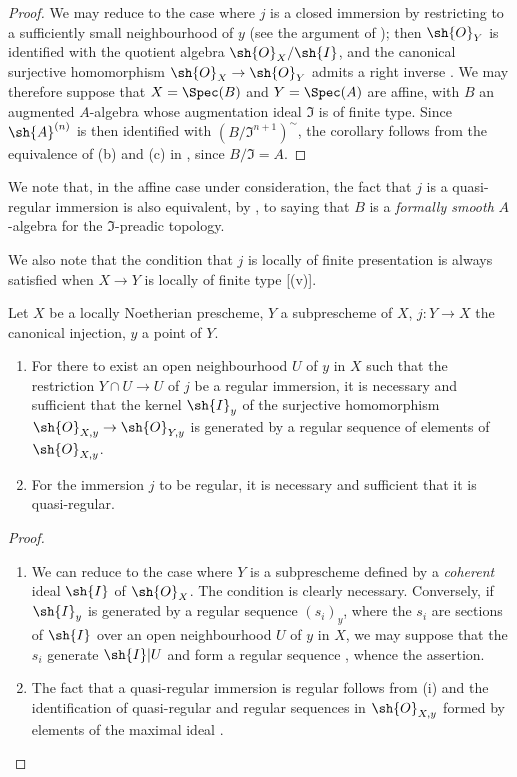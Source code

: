 \begin{proof}
We may reduce to the case where $j$ is a closed immersion by restricting to a sufficiently small neighbourhood of $y$ (see the argument of ); then $\sh{O}_Y$ is identified with the quotient algebra $\sh{O}_X/\sh{I}$, and the canonical surjective homomorphism $\sh{O}_X \to \sh{O}_Y$ admits a
right inverse .
We may therefore suppose that $X = \Spec(B)$ and $Y = \Spec(A)$ are affine, with $B$ an augmented $A$-algebra whose augmentation ideal $\mathfrak{I}$ is of finite type.
Since $\sh{A}^{(n)}$ is then identified with $(B/\mathfrak{I}^{n+1})^{\sim}$, the corollary follows from the equivalence of (b) and (c) in , since $B/\mathfrak{I} = A$.
\end{proof}

We note that, in the affine case under consideration, the fact that $j$ is a quasi-regular immersion is also equivalent, by , to saying that $B$ is a \emph{formally smooth} $A$-algebra for the $\mathfrak{I}$-preadic topology.

We also note that the condition that $j$ is locally of finite presentation is always satisfied when $X \to Y$ is locally of finite type [(v)].

\begin{proposition}[16.9.10]
\label{IV.16.9.10}
Let $X$ be a locally Noetherian prescheme, $Y$ a subprescheme of $X$, $j:Y \to X$ the canonical injection, $y$ a point of $Y$.
\begin{enumerate}
  \item[\rm{(i)}] For there to exist an open neighbourhood $U$ of $y$ in $X$ such that the restriction $Y \cap U \to U$ of $j$ be a regular immersion, it is necessary and sufficient that the kernel $\sh{I}_y$ of the surjective homomorphism $\sh{O}_{X,y} \to \sh{O}_{Y,y}$ is generated by a regular sequence of elements of $\sh{O}_{X,y}$.

  \item[\rm{(ii)}] For the immersion $j$ to be regular, it is necessary and sufficient that it is quasi-regular.
\end{enumerate}
\end{proposition}

\begin{proof}
  \begin{enumerate}
    \item[\rm{(i)}] We can reduce to the case where $Y$ is a subprescheme defined by a \emph{coherent} ideal $\sh{I}$ of $\sh{O}_X$.
    The condition is clearly necessary.
    Conversely, if $\sh{I}_y$ is generated by a regular sequence $(s_i)_y$, where the $s_i$ are sections of $\sh{I}$ over an open neighbourhood $U$ of $y$ in $X$, we may suppose that the $s_i$ generate $\sh{I}|U$  and form a regular sequence , whence the assertion.
    \item[\rm{(ii)}] The fact that a quasi-regular immersion is regular follows from (i) and the identification of quasi-regular and regular sequences in $\sh{O}_{X,y}$ formed by elements of the maximal ideal .
  \end{enumerate}
\end{proof}

